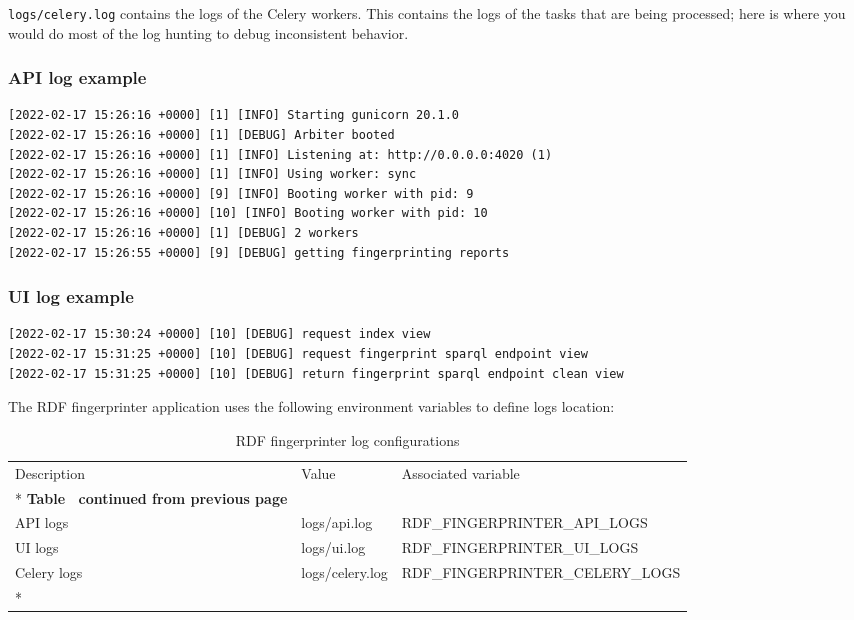\texttt{logs/celery.log} contains the logs of the Celery workers. This contains the logs of the tasks that are being processed; here is where you would do most of the log hunting to debug inconsistent behavior.

\subsubsection{API log example}
\begin{lstlisting}
[2022-02-17 15:26:16 +0000] [1] [INFO] Starting gunicorn 20.1.0
[2022-02-17 15:26:16 +0000] [1] [DEBUG] Arbiter booted
[2022-02-17 15:26:16 +0000] [1] [INFO] Listening at: http://0.0.0.0:4020 (1)
[2022-02-17 15:26:16 +0000] [1] [INFO] Using worker: sync
[2022-02-17 15:26:16 +0000] [9] [INFO] Booting worker with pid: 9
[2022-02-17 15:26:16 +0000] [10] [INFO] Booting worker with pid: 10
[2022-02-17 15:26:16 +0000] [1] [DEBUG] 2 workers
[2022-02-17 15:26:55 +0000] [9] [DEBUG] getting fingerprinting reports
\end{lstlisting}

\subsubsection{UI log example}
\begin{lstlisting}
[2022-02-17 15:30:24 +0000] [10] [DEBUG] request index view
[2022-02-17 15:31:25 +0000] [10] [DEBUG] request fingerprint sparql endpoint view
[2022-02-17 15:31:25 +0000] [10] [DEBUG] return fingerprint sparql endpoint clean view
\end{lstlisting}

The RDF fingerprinter application uses the following environment variables to define logs location:

\begin{longtable}[c]{@{}p{3.5cm}p{3.5cm}l@{}}
	\toprule
	Description & Value           & Associated variable          \\* \midrule
	\endfirsthead
	\multicolumn{3}{c}%
	{{\bfseries Table \thetable\ continued from previous page}}  \\
	\endhead
	\bottomrule
	\endfoot
	\endlastfoot
	API logs    & logs/api.log    & RDF\_FINGERPRINTER\_API\_LOGS    \\
	UI logs     & logs/ui.log     & RDF\_FINGERPRINTER\_UI\_LOGS     \\
	Celery logs & logs/celery.log & RDF\_FINGERPRINTER\_CELERY\_LOGS \\* \bottomrule
	\caption{RDF fingerprinter log configurations}
	\label{tab:rdf-fingerprinter-log}                                \\
\end{longtable}
